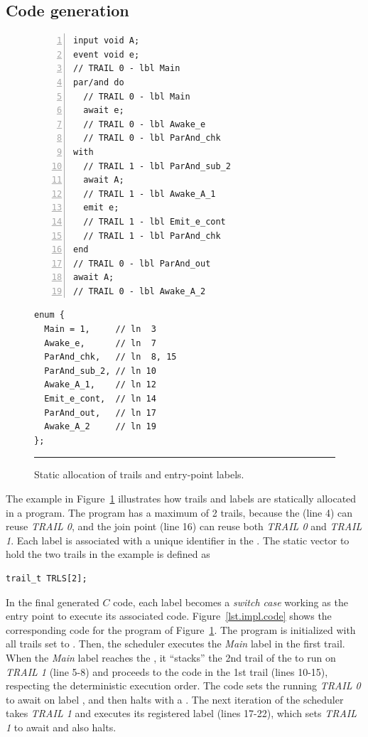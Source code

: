 \subsection{Code generation}

\begin{figure}[t]
\begin{minipage}[t]{0.55\linewidth}
\begin{lstlisting}[numbers=left,xleftmargin=2em]
input void A;
event void e;
// TRAIL 0 - lbl Main
par/and do
  // TRAIL 0 - lbl Main
  await e;
  // TRAIL 0 - lbl Awake_e
  // TRAIL 0 - lbl ParAnd_chk
with
  // TRAIL 1 - lbl ParAnd_sub_2
  await A;
  // TRAIL 1 - lbl Awake_A_1
  emit e;
  // TRAIL 1 - lbl Emit_e_cont
  // TRAIL 1 - lbl ParAnd_chk
end
// TRAIL 0 - lbl ParAnd_out
await A;
// TRAIL 0 - lbl Awake_A_2
\end{lstlisting}
\end{minipage}
%
\begin{minipage}[t]{0.45\linewidth}
\begin{lstlisting}
enum {
  Main = 1,     // ln  3
  Awake_e,      // ln  7
  ParAnd_chk,   // ln  8, 15
  ParAnd_sub_2, // ln 10
  Awake_A_1,    // ln 12
  Emit_e_cont,  // ln 14
  ParAnd_out,   // ln 17
  Awake_A_2     // ln 19
};
\end{lstlisting}
\end{minipage}
\rule{14cm}{0.37pt}
\caption{
Static allocation of trails and entry-point labels.
\label{lst.impl.trails}
}
\end{figure}

The example in Figure~\ref{lst.impl.trails} illustrates how trails and labels 
are statically allocated in a program.
%
The program has a maximum of 2 trails, because the  (line 4) can 
reuse \emph{TRAIL 0}, and the join point (line 16) can reuse both \emph{TRAIL 
0} and \emph{TRAIL 1}.
%
Each label is associated with a unique identifier in the .
%
The static vector to hold the two trails in the example is defined as

\begin{lstlisting}
trail_t TRLS[2];
\end{lstlisting}

In the final generated $C$ code, each label becomes a \emph{switch case} 
working as the entry point to execute its associated code.
%
Figure~\ref{lst.impl.code} shows the corresponding code for the program of 
Figure~\ref{lst.impl.trails}.
%
The program is initialized with all trails set to .
Then, the scheduler executes the \emph{Main} label in the first trail.
%
When the \emph{Main} label reaches the , it ``stacks'' the 2nd 
trail of the  to run on \emph{TRAIL 1} (line 5-8) and proceeds to 
the code in the 1st trail (lines 10-15), respecting the deterministic execution 
order.
%
The code sets the running \emph{TRAIL 0} to await  on label 
, and then halts with a .
%
The next iteration of the scheduler takes \emph{TRAIL 1} and executes its 
registered label  (lines 17-22), which sets \emph{TRAIL 1} 
to await  and also halts.


